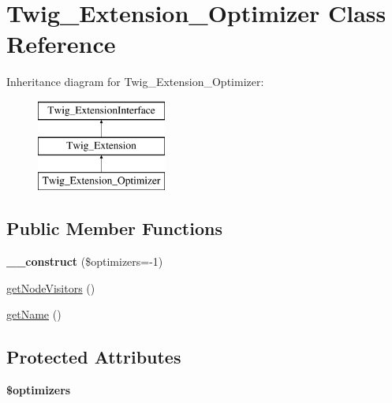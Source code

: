 \hypertarget{classTwig__Extension__Optimizer}{}\section{Twig\+\_\+\+Extension\+\_\+\+Optimizer Class Reference}
\label{classTwig__Extension__Optimizer}
Inheritance diagram for Twig\+\_\+\+Extension\+\_\+\+Optimizer\+:\begin{figure}[H]
\begin{center}
\leavevmode
\includegraphics[height=3.000000cm]{classTwig__Extension__Optimizer}
\end{center}
\end{figure}
\subsection*{Public Member Functions}
\begin{DoxyCompactItemize}
\item 
{\bfseries \+\_\+\+\_\+construct} (\$optimizers=-\/1)\hypertarget{classTwig__Extension__Optimizer_a9ae8e726ef4a5f6656988abff3b13db9}{}\label{classTwig__Extension__Optimizer_a9ae8e726ef4a5f6656988abff3b13db9}

\item 
\hyperlink{classTwig__Extension__Optimizer_ae9840f40710611ca598eced60bf32188}{get\+Node\+Visitors} ()
\item 
\hyperlink{classTwig__Extension__Optimizer_af6ea20c1dec5e68fa5f3534e39b442fe}{get\+Name} ()
\end{DoxyCompactItemize}
\subsection*{Protected Attributes}
\begin{DoxyCompactItemize}
\item 
{\bfseries \$optimizers}\hypertarget{classTwig__Extension__Optimizer_a7ad44c75bd52f34321328b0b71ba958c}{}\label{classTwig__Extension__Optimizer_a7ad44c75bd52f34321328b0b71ba958c}

\end{DoxyCompactItemize}


